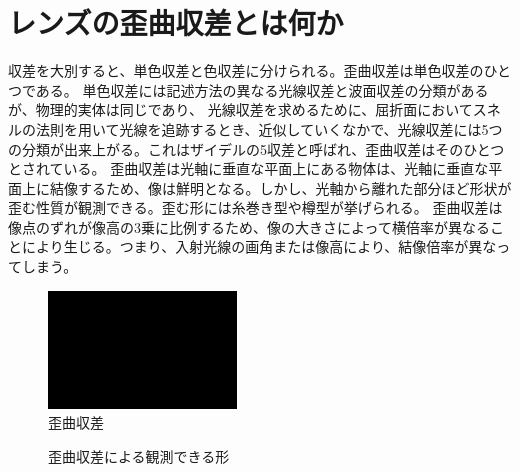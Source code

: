 \section{レンズの歪曲収差とは何か}
収差を大別すると、単色収差と色収差に分けられる。歪曲収差は単色収差のひとつである。
単色収差には記述方法の異なる光線収差と波面収差の分類があるが、物理的実体は同じであり、
光線収差を求めるために、屈折面においてスネルの法則を用いて光線を追跡するとき、近似していくなかで、光線収差には5つの分類が出来上がる。これはザイデルの5収差と呼ばれ、歪曲収差はそのひとつとされている。
歪曲収差は光軸に垂直な平面上にある物体は、光軸に垂直な平面上に結像するため、像は鮮明となる。しかし、光軸から離れた部分ほど形状が歪む性質が観測できる。歪む形には糸巻き型や樽型が挙げられる。
歪曲収差は像点のずれが像高の3乗に比例するため、像の大きさによって横倍率が異なることにより生じる。つまり、入射光線の画角または像高により、結像倍率が異なってしまう。

\begin{figure}[h]
	\centering
	\includegraphics[width=50mm]{image/dummy.png.eps}
	\caption{歪曲収差}
	\label{caption1}
\end{figure}

\begin{figure}[h]
    
    \centering
    
    \caption{歪曲収差による観測できる形}
    \label{shape}
    \end{figure}